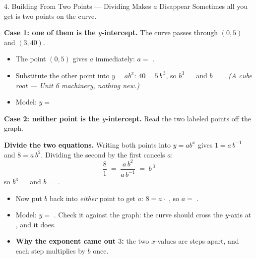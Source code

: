 \documentclass[10pt]{article}
\newcommand{\lgrid}[4]{%
  \draw[step=1, linegray!40, very thin] (#1,#3) grid (#2,#4);
  \draw[->, semithick, charcoal] (#1,0)--(#2,0) node[below right, font=\scriptsize]{$x$};
  \draw[->, semithick, charcoal] (0,#3)--(0,#4) node[left, font=\scriptsize]{$y$};}
\newcommand{\expcurve}[4]{\draw[very thick, forest, domain=#3:#4, samples=120, smooth]
  plot (\x,{#1*exp((#2)*(\x))});}
\begin{document}
\begin{notesbox}{4. Building From Two Points --- Dividing Makes $a$ Disappear}
Sometimes all you get is two points on the curve.

\vspace{3pt}
\textbf{Case 1: one of them is the $y$-intercept.} The curve passes through $(0,5)$ and $(3,40)$.
\begin{itemize}[leftmargin=1.5em, itemsep=3pt]
  \item The point $(0,5)$ gives $a$ immediately: $a=$ \blank{1.2cm}.
  \item Substitute the other point into $y=ab^{x}$: \; $40 = 5\,b^{\,3}$, so $b^{3}=$
        \blank{1.2cm} and $b=$ \blank{1.2cm}. \;
        \emph{(A cube root --- Unit 6 machinery, nothing new.)}
  \item Model: $y=$ \blank{2.8cm}
\end{itemize}

\vspace{4pt}
\textbf{Case 2: neither point is the $y$-intercept.} Read the two labeled points off the graph.
\begin{center}
\begin{minipage}[c]{0.46\linewidth}
\centering
{}
\end{minipage}
\begin{minipage}[c]{0.50\linewidth}
\small
\textbf{Divide the two equations.} Writing both points into $y=ab^{x}$ gives
$1=a\,b^{-1}$ and $8=a\,b^{2}$. Dividing the second by the first cancels $a$:
\[
  \frac{8}{1} \;=\; \frac{a\,b^{2}}{a\,b^{-1}} \;=\; b^{\,3}
\]
so $b^{3}=$ \blank{1.0cm} and $b=$ \blank{1.0cm}.
\end{minipage}
\end{center}
\begin{itemize}[leftmargin=1.5em, itemsep=3pt]
  \item Now put $b$ back into \emph{either} point to get $a$: \; $8=a\cdot$ \blank{1.0cm}, so
        $a=$ \blank{1.0cm}.
  \item Model: $y=$ \blank{2.6cm}. \; Check it against the graph: the curve should cross the
        $y$-axis at \blank{1.6cm}, and it does.
  \item \textbf{Why the exponent came out $3$:} the two $x$-values are \blank{1.4cm} steps apart,
        and each step multiplies by $b$ once.
\end{itemize}
\end{notesbox}
\end{document}
